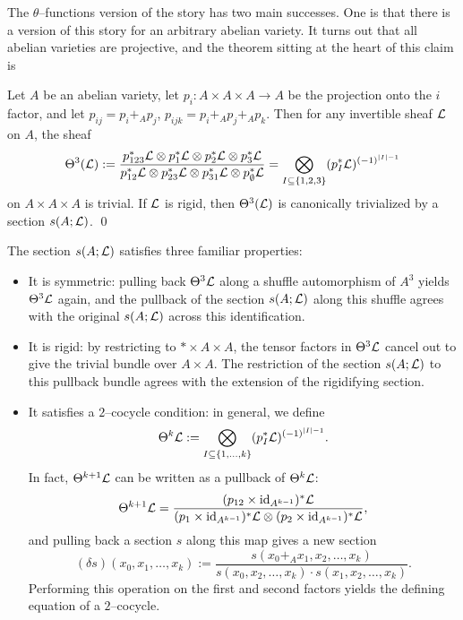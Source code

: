 The $\theta$--functions version of the story has two main successes.  One is that there is a version of this story for an arbitrary abelian variety.  It turns out that all abelian varieties are projective, and the theorem sitting at the heart of this claim is
\begin{corollary}\label{Theta3IsTrivial}
Let $A$ be an abelian variety, let $p_i: A \times A \times A \to A$ be the projection onto the $i${\th} factor, and let $p_{ij} = p_i +_A p_j$, $p_{ijk} = p_i +_A p_j +_A p_k$.  Then for any invertible sheaf $\mathcal{L}$ on $A$, the sheaf \[\Theta^3(\mathcal{L}) := \frac{p_{123}^* \mathcal{L} \otimes p_1^* \mathcal{L} \otimes p_2^* \mathcal{L} \otimes p_3^* \mathcal{L}}{p_{12}^* \mathcal{L} \otimes p_{23}^* \mathcal{L} \otimes p_{31}^* \mathcal{L} \otimes p_\emptyset^* \mathcal{L}} = \bigotimes_{I \subseteq \{1, 2, 3\}} (p_I^* \mathcal{L})^{(-1)^{|I| - 1}}\] on $A \times A \times A$ is trivial.  If $\mathcal{L}$ is rigid, then $\Theta^3(\mathcal{L})$ is canonically trivialized by a section $s(A; \mathcal{L})$. \qed
\end{corollary}

\begin{remark}
The section $s(A; \mathcal{L})$ satisfies three familiar properties:
\begin{itemize}
\item It is symmetric: pulling back $\Theta^3 \mathcal{L}$ along a shuffle automorphism of $A^3$ yields $\Theta^3 \mathcal{L}$ again, and the pullback of the section $s(A; \mathcal{L})$ along this shuffle agrees with the original $s(A; \mathcal{L})$ across this identification.
\item It is rigid: by restricting to $* \times A \times A$, the tensor factors in $\Theta^3 \mathcal{L}$ cancel out to give the trivial bundle over $A \times A$.  The restriction of the section $s(A; \mathcal{L})$ to this pullback bundle agrees with the extension of the rigidifying section.
\item It satisfies a $2$--cocycle condition: in general, we define \[\Theta^k \mathcal{L} := \bigotimes_{I \subseteq \{1, \ldots, k\}} (p_I^* \mathcal{L})^{(-1)^{|I| - 1}}.\]  In fact, $\Theta^{k+1} \mathcal{L}$ can be written as a pullback of $\Theta^k \mathcal{L}$: \[\Theta^{k+1} \mathcal{L} = \frac{(p_{12} \times \mathrm{id}_{A^{k-1}})^* \mathcal{L}}{(p_1 \times \mathrm{id}_{A^{k-1}})^* \mathcal{L} \otimes (p_2 \times \mathrm{id}_{A^{k-1}})^* \mathcal{L}},\] and pulling back a section $s$ along this map gives a new section \[(\delta s)(x_0, x_1, \ldots, x_k) := \frac{s(x_0 +_A x_1, x_2, \ldots, x_k)}{s(x_0, x_2, \ldots, x_k) \cdot s(x_1, x_2, \ldots, x_k)}.\]  Performing this operation on the first and second factors yields the defining equation of a $2$--cocycle.
\end{itemize}
\end{remark}

